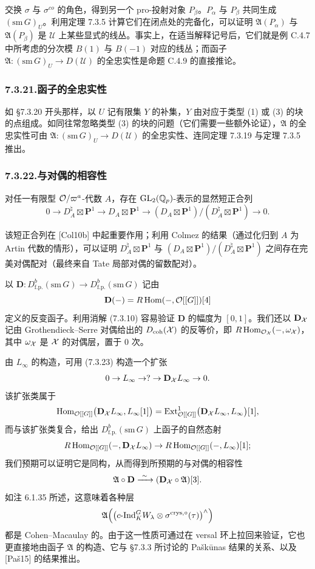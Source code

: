 交换 $\sigma$ 与 $\sigma^{co}$ 的角色，得到另一个 pro-投射对象 $P_\beta$。$P_\alpha$ 与 $P_\beta$ 共同生成 $(\mathrm{sm}\,G)_U$。利用定理 7.3.5 计算它们在闭点处的完备化，可以证明 $\mathfrak A(P_\alpha)$ 与 $\mathfrak A(P_\beta)$ 是 $\mathcal U$ 上某些显式的线丛。事实上，在适当解释记号后，它们就是例 C.4.7 中所考虑的分次模 $B(1)$ 与 $B(-1)$ 对应的线丛；而函子 $\mathfrak A:(\mathrm{sm}\,G)_U\to D(\mathcal U)$ 的全忠实性是命题 C.4.9 的直接推论。

\subsubsection*{7.3.21.\quad 函子的全忠实性}
如 §7.3.20 开头那样，以 $U$ 记有限集 $Y$ 的补集，$Y$ 由对应于类型 (1) 或 (3) 的块的点组成。如同往常忽略类型 (3) 的块的问题（它们需要一些额外论证），$\mathfrak A$ 的全忠实性可由 $\mathfrak A:(\mathrm{sm}\,G)_U\to D(\mathcal U)$ 的全忠实性、连同定理 7.3.19 与定理 7.3.5 推出。

\subsubsection*{7.3.22.\quad 与对偶的相容性}
对任一有限型 $\mathcal{O}/\varpi^a$-代数 $A$，存在 $\mathrm{GL}_2(\mathbb{Q}_p)$-表示的显然短正合列
\begin{equation}\tag{7.3.23}\label{eq:a4-7-3-23}
0\to D_A^\natural\boxtimes\mathbf P^1\to D_A\boxtimes\mathbf P^1\to(D_A\boxtimes\mathbf P^1)/(D_A^\natural\boxtimes\mathbf P^1)\to0.
\end{equation}

该短正合列在 [Col10b] 中起重要作用；利用 Colmez 的结果（通过化归到 $A$ 为 Artin 代数的情形），可以证明 $D_A^\natural\boxtimes\mathbf P^1$ 与 $(D_A\boxtimes\mathbf P^1)/(D_A^\natural\boxtimes\mathbf P^1)$ 之间存在完美对偶配对（最终来自 Tate 局部对偶的留数配对）。

以 $\mathbf D:D^b_{\mathrm{f.p.}}(\mathrm{sm}\,G)\to D^b_{\mathrm{f.p.}}(\mathrm{sm}\,G)$ 记由
\[
\mathbf D(-)=R\operatorname{Hom}(-,\mathcal{O}[[G]])[4]
\]
定义的反变函子。利用消解 (7.3.10) 容易验证 $\mathbf D$ 的幅度为 $[0,1]$。我们还以 $\mathbf D_{\mathcal{X}}$ 记由 Grothendieck--Serre 对偶给出的 $D_{\mathrm{coh}}(\mathcal{X})$ 的反等价，即 $R\operatorname{Hom}_{\mathcal{O}_{\mathcal{X}}}(-,\omega_{\mathcal{X}})$，其中 $\omega_{\mathcal{X}}$ 是 $\mathcal{X}$ 的对偶层，置于 $0$ 次。

由 $L_\infty$ 的构造，可用 (7.3.23) 构造一个扩张
\[
0\to L_\infty\to?\to\mathbf D_{\mathcal{X}}L_\infty\to0.
\]
该扩张类属于
\[
\operatorname{Hom}_{\mathcal{O}[[G]]}\bigl(\mathbf D_{\mathcal{X}}L_\infty,L_\infty[1]\bigr)=\operatorname{Ext}^1_{\mathcal{O}[[G]]}\bigl(\mathbf D_{\mathcal{X}}L_\infty,L_\infty\bigr)[1],
\]
而与该扩张类复合，给出 $D^b_{\mathrm{f.p.}}(\mathrm{sm}\,G)$ 上函子的自然态射
\[
R\operatorname{Hom}_{\mathcal{O}[[G]]}(-,\mathbf D_{\mathcal{X}}L_\infty)\to R\operatorname{Hom}_{\mathcal{O}[[G]]}(-,L_\infty)[1];
\]
我们预期可以证明它是同构，从而得到所预期的与对偶的相容性
\[
\mathfrak A\circ\mathbf D\xrightarrow{\ \sim\ }(\mathbf D_{\mathcal{X}}\circ\mathfrak A)[3].
\]
如注 6.1.35 所述，这意味着各种层
\[
\mathfrak A\Bigl(\bigl(c\text{-Ind}_K^GW_\lambda\otimes\sigma^{\mathrm{crys},\circ}(\tau)\bigr)^\wedge\Bigr)
\]
都是 Cohen--Macaulay 的。由于这一性质可通过在 versal 环上拉回来验证，它也更直接地由函子 $\mathfrak A$ 的构造、它与 §7.3.3 所讨论的 Paškūnas 结果的关系、以及 [Paš15] 的结果推出。

